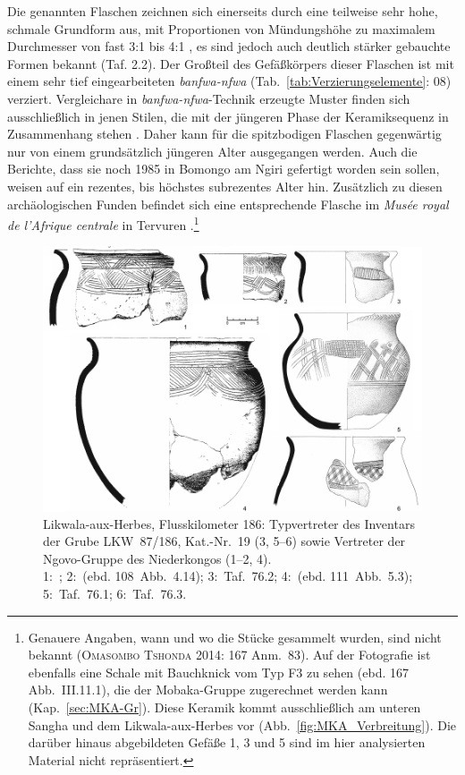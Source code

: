Die genannten Flaschen zeichnen sich einerseits durch eine teilweise sehr hohe, schmale Grundform aus, mit Proportionen von Mündungshöhe zu maximalem Durchmesser von fast 3:1 bis 4:1 \parencites[siehe Taf.~4.8;][531 Taf. 97.10]{Wotzka.1995}[167 Abb.~III.11.1]{OmasomboTshonda.2014}, es sind jedoch auch deutlich stärker gebauchte Formen bekannt (Taf. 2.2). Der Großteil des Gefäßkörpers dieser Flaschen ist mit einem sehr tief eingearbeiteten \textit{banfwa-nfwa} (Tab.~\ref{tab:Verzierungselemente}: 08) verziert. Vergleichare in \textit{banfwa-nfwa}-Technik erzeugte Muster finden sich ausschließlich in jenen Stilen, die mit der jüngeren Phase der Keramiksequenz in Zusammenhang stehen \parencite[siehe Kap.~\ref{sec:BKW-Gr}, \ref{sec:EBA-Gr},][109--111]{Wotzka.1995}. Daher kann für die spitzbodigen Flaschen gegenwärtig nur von einem grundsätzlich jüngeren Alter ausgegangen werden. Auch die Berichte, dass sie noch 1985 in Bomongo am Ngiri gefertigt worden sein sollen, weisen auf ein rezentes, bis höchstes subrezentes Alter hin. Zusätzlich zu diesen archäologischen Funden befindet sich eine entsprechende Flasche im \textit{Musée royal de l'Afrique centrale} in Tervuren  \parencite[167 Abb.~III.11.1]{OmasomboTshonda.2014}.\footnote{Genauere Angaben, wann und wo die Stücke gesammelt wurden, sind nicht bekannt (\textsc{Omasombo Tshonda} 2014: 167 Anm.~83). Auf der Fotografie ist ebenfalls eine Schale mit Bauchknick vom Typ F3 zu sehen (ebd. 167 Abb.~III.11.1), die der Mobaka-Gruppe zugerechnet werden kann (Kap.~\ref{sec:MKA-Gr}). Diese Keramik kommt ausschließlich am unteren \mbox{Sangha} und dem \mbox{Likwala}-\mbox{aux}-\mbox{Herbes} vor (Abb.~\ref{fig:MKA_Verbreitung}). Die darüber hinaus abgebildeten Gefäße 1, 3 und 5 sind im hier analysierten Material nicht repräsentiert.}

\begin{figure}[p]
	\centering
	\includegraphics[width=\textwidth]{fig/Ngovo-Typen.pdf}
	\caption{Likwala-aux-Herbes, Flusskilometer 186: Typvertreter des Inventars der Grube LKW~87/186, Kat.-Nr.~19 (3, 5--6) sowie Vertreter der Ngovo-Gruppe des Niederkongos (1--2, 4).\\1:~\textcite[108~Abb.~4.7]{deMaret.1986}; 2:~(ebd. 108~Abb.~4.14); 3:~Taf.~76.2; 4:~(ebd. 111~Abb.~5.3); 5:~Taf.~76.1; 6:~Taf.~76.3.}
	\label{fig:Ngovo_Typvertreter}
\end{figure}

